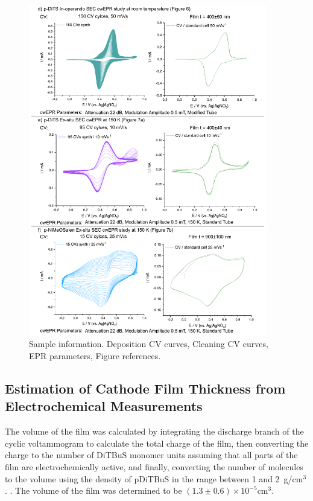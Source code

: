 \begin{figure}[]
\centering
\includegraphics[width=0.93\textwidth]{./electrochemistry/figures/Figure_S3b}
\caption{Sample information. Deposition CV curves, Cleaning CV curves, EPR parameters, Figure references.}
\label{fig:S3}
\end{figure}

\newpage
\subsection*{Estimation of Cathode Film Thickness from Electrochemical Measurements}
The volume of the film was calculated by integrating the discharge branch of the cyclic voltammogram to calculate the total charge of the film, then converting the charge to the number of DiTBuS monomer units assuming that all parts of the film are electrochemically active, and finally, converting the number of molecules to the volume using the density of pDiTBuS in the range between 1 and 2~g/cm$^3$. . The volume of the film was determined to be $\left(1.3\pm0.6\right)\times10^{-5}$cm$^{3}$.\\



